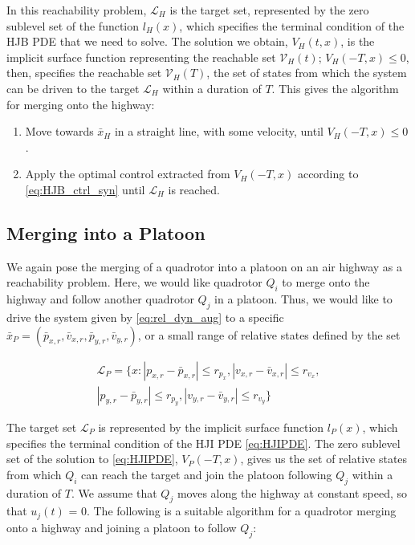 In this reachability problem, $\mathcal{L}_H$ is the target set, represented by the zero sublevel set of the function $l_H(x)$, which specifies the terminal condition of the HJB PDE that we need to solve. The solution we obtain, $V_H(t,x)$, is the implicit surface function representing the reachable set $\mathcal V_H(t)$; $V_H(-T,x)\le 0$, then, specifies the reachable set $\mathcal{V}_H(T)$, the set of states from which the system can be driven to the target $\mathcal{L}_H$ within a duration of $T$. This gives the algorithm for merging onto the highway:

\begin{enumerate}
\item Move towards $\bar{x}_H$ in a straight line, with some velocity, until $V_H(-T,x)\le 0$.
\item Apply the optimal control extracted from $V_H(-T,x)$ according to \eqref{eq:HJB_ctrl_syn} until $\mathcal{L}_H$ is reached.
\end{enumerate}

\subsection{Merging into a Platoon \label{subsec:platoon_merge}}
We again pose the merging of a quadrotor into a platoon on an air highway as a reachability problem. Here, we would like quadrotor $Q_i$ to merge onto the highway and follow another quadrotor $Q_j$ in a platoon. Thus, we would like to drive the system given by \eqref{eq:rel_dyn_aug} to a specific $\bar{x}_P = (\bar{p}_{x,r}, \bar{v}_{x,r}, \bar{p}_{y,r}, \bar{v}_{y,r})$, or a small range of relative states defined by the set

\begin{equation}
\begin{aligned}
\mathcal{L}_P = \{x: |p_{x,r}-\bar{p}_{x,r}|\le r_{p_x}, |v_{x,r}-\bar{v}_{x,r}|\le r_{v_x}, \\
|p_{y,r} - \bar{p}_{y,r}| \le r_{p_y}, |v_{y,r} - \bar{v}_{y,r}|\le r_{v_y} \}
\end{aligned}
\end{equation}

The target set $\mathcal{L}_P$ is represented by the implicit surface function $l_P(x)$, which specifies the terminal condition of the HJI PDE \eqref{eq:HJIPDE}. The zero sublevel set of the solution to \eqref{eq:HJIPDE}, $V_P(-T,x)$, gives us the set of relative states from which $Q_i$ can reach the target and join the platoon following $Q_j$ within a duration of $T$. We assume that $Q_j$ moves along the highway at constant speed, so that $u_j(t)$ = 0. The following is a suitable algorithm for a quadrotor merging onto a highway and joining a platoon to follow $Q_j$:

